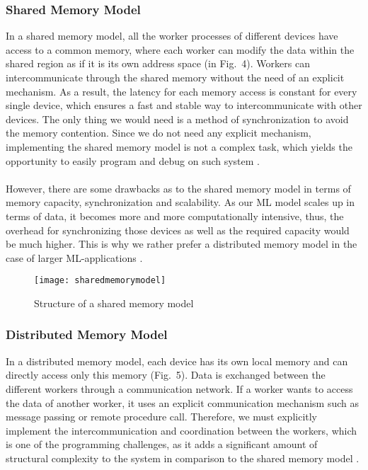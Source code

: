 \documentclass[ieeetran]{article}
\begin{document}
\subsubsection{Shared Memory Model} %
\label{ssub:shared_memory_model}
In a shared memory model, all the worker processes of different devices have access to a common memory, where each worker can modify the data within the shared region as if it is its own address space (in Fig.\ 4). Workers can intercommunicate through the shared memory without the need of an explicit mechanism. As a result, the latency for each memory access is constant for every single device, which ensures a fast and stable way to intercommunicate with other devices. The only thing we would need is a method of synchronization to avoid the memory contention. Since we do not need any explicit mechanism, implementing the shared memory model is not a complex task, which yields the opportunity to easily program and debug on such system \cite{second} \cite{third}. 
\\ \\However, there are some drawbacks as to the shared memory model in terms of memory capacity, synchronization and scalability. As our ML model scales up in terms of data, it becomes more and more computationally intensive, thus, the overhead for synchronizing those devices as well as the required capacity would be much higher. This is why we rather prefer a distributed memory model in the case of larger ML-applications \cite{third}.



\begin{figure}[h!]
  \centering
  \texttt{[image: sharedmemorymodel]}
  \caption{Structure of a shared memory model}
  \label{fig:sharedmemorymodel}
\end{figure}


\subsubsection{Distributed Memory Model} %
\label{ssub:distributed_memory_model}
In a distributed memory model, each device has its own local memory and can directly access only this memory (Fig.\ 5). Data is exchanged between the different workers through a communication network. If a worker wants to access the data of another worker, it uses an explicit communication mechanism such as message passing or remote procedure call. Therefore, we must explicitly implement the intercommunication and coordination between the workers, which is one of the programming challenges, as it adds a significant amount of structural complexity to the system in comparison to the shared memory model \cite{third}. 
\end{document}
